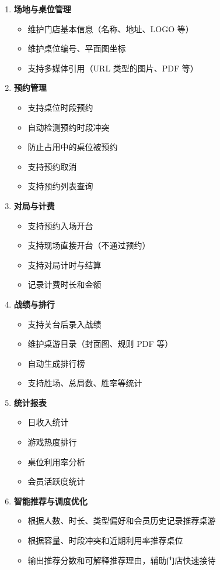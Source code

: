 \begin{enumerate}[label=\textbf{R\arabic*}]
  \item \textbf{场地与桌位管理}
    \begin{itemize}
      \item 维护门店基本信息（名称、地址、LOGO 等）
      \item 维护桌位编号、平面图坐标
      \item 支持多媒体引用（URL 类型的图片、PDF 等）
    \end{itemize}

  \item \textbf{预约管理}
    \begin{itemize}
      \item 支持桌位时段预约
      \item 自动检测预约时段冲突
      \item 防止占用中的桌位被预约
      \item 支持预约取消
      \item 支持预约列表查询
    \end{itemize}

  \item \textbf{对局与计费}
    \begin{itemize}
      \item 支持预约入场开台
      \item 支持现场直接开台（不通过预约）
      \item 支持对局计时与结算
      \item 记录计费时长和金额
    \end{itemize}

  \item \textbf{战绩与排行}
    \begin{itemize}
      \item 支持关台后录入战绩
      \item 维护桌游目录（封面图、规则 PDF 等）
      \item 自动生成排行榜
      \item 支持胜场、总局数、胜率等统计
    \end{itemize}

  \item \textbf{统计报表}
    \begin{itemize}
      \item 日收入统计
      \item 游戏热度排行
      \item 桌位利用率分析
      \item 会员活跃度统计
    \end{itemize}

  \item \textbf{智能推荐与调度优化}
    \begin{itemize}
      \item 根据人数、时长、类型偏好和会员历史记录推荐桌游
      \item 根据容量、时段冲突和近期利用率推荐桌位
      \item 输出推荐分数和可解释推荐理由，辅助门店快速接待
    \end{itemize}
\end{enumerate}

